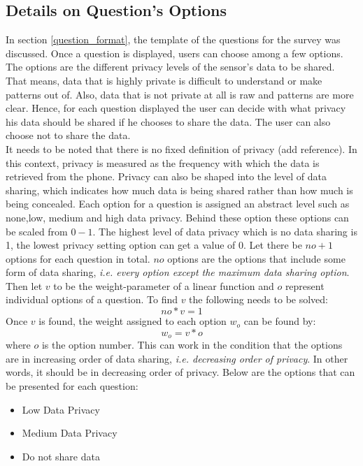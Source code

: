 \subsection{Details on Question's Options}
In section \ref{question_format}, the template of the questions for the survey was discussed. Once a question is displayed, users can choose among a few options.
The options are the different privacy levels of the sensor's data to be shared. That means, data that is highly private is difficult to understand or make patterns out of. Also, data that is not private at all is raw and 
patterns are more clear. Hence, for each question displayed the user can decide with what privacy his data should be shared if he chooses to share the data. The user can
also choose not to share the data.\\
It needs to be noted that there is no fixed definition of privacy (add reference). In this context, privacy is measured as the frequency with which the data is retrieved from the phone.
Privacy can also be shaped into the level of data sharing, which indicates how much data is being shared rather than how much is being concealed. Each option for a question is assigned an abstract level such as none,low, medium and high data privacy. Behind these option these options can be scaled from $0-1$. The highest level of data privacy which is no data sharing is 1, the lowest privacy setting option can get a value of 0. Let there be $no + 1$ options for
each question in total. $no$ options are the options that include some form of data sharing, {\it i.e. every option except the maximum data sharing option}. Then let $v$ to be the weight-parameter of a linear function and $o$ represent individual options
of a question. To find $v$ the following needs to be solved:
$$ no*v = 1$$
Once $v$ is found, the weight assigned to each option $w_o$ can be found by:
$$w_o = v*o$$
where $o$ is the option number. This can work in the condition that the options are in increasing order of data sharing, {\it i.e. decreasing order of privacy}.
In other words, it should be in decreasing order of privacy. Below are the options that can be presented for each question:
\begin{itemize}
\item Low Data Privacy
\item Medium Data Privacy
\item Do not share data

\end{itemize}


